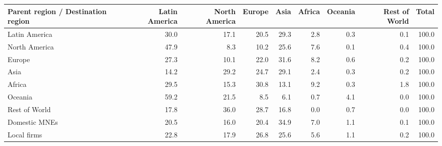 \begin{tabular}{lrrrrrrrr}
\toprule
Parent region / Destination region & Latin America & North America & Europe & Asia & Africa & Oceania & Rest of World & Total \\
\midrule
Latin America & 30.0 & 17.1 & 20.5 & 29.3 & 2.8 & 0.3 & 0.1 & 100.0 \\
North America & 47.9 & 8.3 & 10.2 & 25.6 & 7.6 & 0.1 & 0.4 & 100.0 \\
Europe & 27.3 & 10.1 & 22.0 & 31.6 & 8.2 & 0.6 & 0.2 & 100.0 \\
Asia & 14.2 & 29.2 & 24.7 & 29.1 & 2.4 & 0.3 & 0.2 & 100.0 \\
Africa & 29.5 & 15.3 & 30.8 & 13.1 & 9.2 & 0.3 & 1.8 & 100.0 \\
Oceania & 59.2 & 21.5 & 8.5 & 6.1 & 0.7 & 4.1 & 0.0 & 100.0 \\
Rest of World & 17.8 & 36.0 & 28.7 & 16.8 & 0.0 & 0.7 & 0.0 & 100.0 \\
Domestic MNEs & 20.5 & 16.0 & 20.4 & 34.9 & 7.0 & 1.1 & 0.1 & 100.0 \\
Local firms & 22.8 & 17.9 & 26.8 & 25.6 & 5.6 & 1.1 & 0.2 & 100.0 \\
\bottomrule
\end{tabular}
